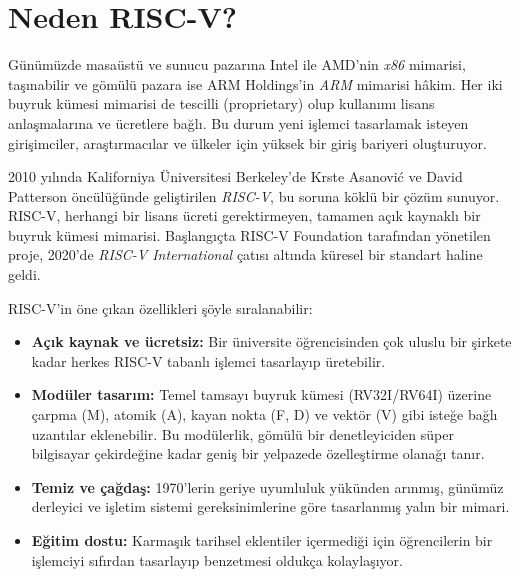 \section{Neden RISC-V?}
\label{sec:neden-riscv}

Günümüzde masaüstü ve sunucu pazarına Intel ile AMD'nin \emph{x86} mimarisi, taşınabilir ve gömülü pazara ise ARM Holdings'in \emph{ARM} mimarisi hâkim. Her iki buyruk kümesi mimarisi de tescilli (proprietary) olup kullanımı lisans anlaşmalarına ve ücretlere bağlı. Bu durum yeni işlemci tasarlamak isteyen girişimciler, araştırmacılar ve ülkeler için yüksek bir giriş bariyeri oluşturuyor.

2010 yılında Kaliforniya Üniversitesi Berkeley'de Krste Asanovi\'{c} ve David Patterson öncülüğünde geliştirilen \emph{RISC-V}, bu soruna köklü bir çözüm sunuyor. RISC-V, herhangi bir lisans ücreti gerektirmeyen, tamamen açık kaynaklı bir buyruk kümesi mimarisi. Başlangıçta RISC-V Foundation tarafından yönetilen proje, 2020'de \emph{RISC-V International} çatısı altında küresel bir standart haline geldi.

RISC-V'in öne çıkan özellikleri şöyle sıralanabilir:
\begin{itemize}
    \item \textbf{Açık kaynak ve ücretsiz:} Bir üniversite öğrencisinden çok uluslu bir şirkete kadar herkes RISC-V tabanlı işlemci tasarlayıp üretebilir.
    \item \textbf{Modüler tasarım:} Temel tamsayı buyruk kümesi (RV32I/RV64I) üzerine çarpma (M), atomik (A), kayan nokta (F, D) ve vektör (V) gibi isteğe bağlı uzantılar eklenebilir. Bu modülerlik, gömülü bir denetleyiciden süper bilgisayar çekirdeğine kadar geniş bir yelpazede özelleştirme olanağı tanır.
    \item \textbf{Temiz ve çağdaş:} 1970'lerin geriye uyumluluk yükünden arınmış, günümüz derleyici ve işletim sistemi gereksinimlerine göre tasarlanmış yalın bir mimari.
    \item \textbf{Eğitim dostu:} Karmaşık tarihsel eklentiler içermediği için öğrencilerin bir işlemciyi sıfırdan tasarlayıp benzetmesi oldukça kolaylaşıyor.
\end{itemize}

